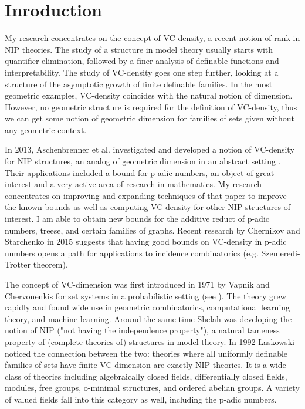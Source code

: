 \chapter{Inroduction}

My research concentrates on the concept of VC-density, a recent notion of rank in NIP theories.
The study of a structure in model theory usually starts with quantifier elimination, followed by a finer analysis of definable functions and interpretability.
The study of VC-density goes one step further, looking at a structure of the asymptotic growth of finite definable families.
In the most geometric examples, VC-density coincides with the natural notion of dimension.
However, no geometric structure is required for the definition of VC-density, thus we can get some notion of geometric dimension for families of sets given without any geometric context.

In 2013, Aschenbrenner et al. investigated and developed a notion of VC-density for NIP structures, an analog of geometric dimension in an abstract setting \cite{density}. Their applications included a bound for p-adic numbers, an object of great interest and a very active area of research in mathematics. My research concentrates on improving and expanding techniques of that paper to improve the known bounds as well as computing VC-density for other NIP structures of interest. I am able to obtain new bounds for the additive reduct of p-adic numbers, treese, and certain families of graphs. Recent research by Chernikov and Starchenko in 2015 \cite{regularity} suggests that having good bounds on VC-density in p-adic numbers opens a path for applications to incidence combinatorics (e.g. Szemeredi-Trotter theorem).

The concept of VC-dimension was first introduced in 1971 by Vapnik and Chervonenkis for set systems in a probabilistic setting (see \cite{density}). The theory grew rapidly and found wide use in geometric combinatorics, computational learning theory, and machine learning. Around the same time Shelah was developing the notion of NIP ("not having the independence property"), a natural tameness property of (complete theories of) structures in model theory. In 1992 Laskowski noticed the connection between the two: theories where all uniformly definable families of sets have finite VC-dimension are exactly NIP theories. It is a wide class of theories including algebraically closed fields, differentially closed fields, modules, free groups, o-minimal structures, and ordered abelian groups. A variety of valued fields fall into this category as well, including the p-adic numbers.

